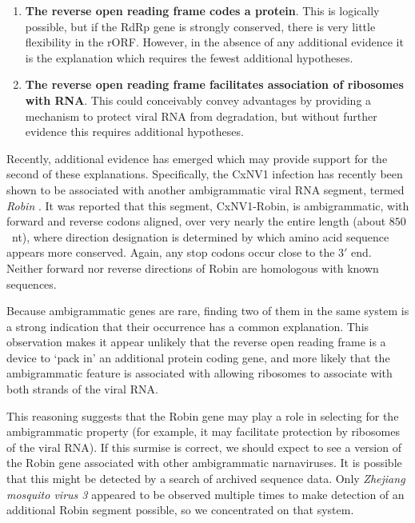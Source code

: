 \documentclass[unnumsec,webpdf,contemporary,large]{oup-authoring-template}%
\theoremstyle{thmstyleone}%
\theoremstyle{thmstyletwo}%
\theoremstyle{thmstylethree}%
\begin{document}
\begin{enumerate}

\item {\bf The reverse open reading frame codes a protein}. This is logically possible, but
if the RdRp gene is strongly conserved, there is very little flexibility in the rORF. However, in the
absence of any additional evidence it is the explanation which requires the fewest additional hypotheses.

\item {\bf The reverse open reading frame facilitates association of ribosomes with RNA}. This
could conceivably convey advantages by providing a mechanism to protect viral RNA from
degradation, but without further evidence this requires additional hypotheses.

\end{enumerate}

Recently, additional evidence has emerged which may provide support for the second of these explanations.
Specifically, the CxNV1 infection has recently been shown to be associated with another ambigrammatic viral
RNA segment, termed \emph{Robin} \citep{Bat+20,Ret+20}. It was reported that this segment, CxNV1-Robin,
is ambigrammatic, with forward and reverse codons aligned, over very nearly
the entire length (about $850$~nt), where direction designation is determined by which
amino acid sequence appears more conserved. Again, any stop codons occur close to the $3'$ end.
Neither forward nor reverse directions of Robin are homologous with known sequences.

Because ambigrammatic genes are rare, finding two of them in the same system is a strong
indication that their occurrence has a common explanation. This observation makes it
appear unlikely that the reverse open reading frame is a device to \lq pack in' an additional
protein coding gene, and more likely that the ambigrammatic feature is associated with
allowing ribosomes to associate with both strands of the viral RNA.

This reasoning suggests that the Robin gene may play a role in selecting for the
ambigrammatic property (for example, it may facilitate protection by ribosomes of the  viral RNA).
If this surmise is correct, we should expect to see a version of the Robin
gene associated with other ambigrammatic narnaviruses. It is possible that this might be detected
by a search of archived sequence data. Only \emph{Zhejiang mosquito virus 3} appeared to
be observed multiple times to make detection of an additional Robin segment possible, so we
concentrated on that system.
\end{document}
